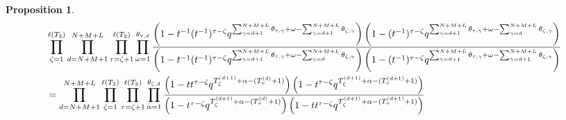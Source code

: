 \documentclass[12pt,reqno,a4paper]{amsart}
\numberwithin{equation}{section}
\newtheorem{prop}[thm]{Proposition}
\theoremstyle{definition}
\begin{document}
\begin{prop}
\label{prpa2-17aug-sun-1329}
\footnotesize
\begin{align}
	&\prod_{\zeta = 1}^{\ell(T_2)}
	\prod_{d = N+M+1}^{N+M+L} 
	\prod_{\tau = \zeta + 1}^{\ell(T_2)} 
	\prod_{\omega = 1}^{\theta_{\tau,d}}
	\frac{
		\left(		1 - t^{-1} (t^{-1})^{\tau - \zeta}	q^{	\sum_{\gamma = d+1}^{N + M + L}\theta_{\tau,\gamma}	+ \omega - 	\sum_{\gamma = d+ 1}^{N + M + L} \theta_{\zeta,\gamma}				}			\right)
		\left(
		1 - (t^{-1})^{\tau - \zeta}	q^{	\sum_{\gamma = d+1}^{N + M + L}\theta_{\tau,\gamma}	+ \omega - 	\sum_{\gamma = d}^{N + M + L} \theta_{\zeta,\gamma}				}		
		\right)
	}{
		\left(		1 - t^{-1} (t^{-1})^{\tau - \zeta}	q^{	\sum_{\gamma = d+1}^{N + M + L}\theta_{\tau,\gamma}	+ \omega - 	\sum_{\gamma = d}^{N + M + L} \theta_{\zeta,\gamma}				}			\right)
		\left(
		1 - (t^{-1})^{\tau - \zeta}	q^{	\sum_{\gamma = d+1}^{N + M + L}\theta_{\tau,\gamma}	+ \omega - 	\sum_{\gamma = d+1}^{N + M + L} \theta_{\zeta,\gamma}				}		
		\right)
	}
	\notag 
	\\
	&=
	\prod_{d = N+M+1}^{N+M+L} 
	\prod_{\zeta = 1}^{\ell(T_2)}
	\prod_{\tau = \zeta + 1}^{\ell(T_2)} 
	\prod_{\alpha = 1}^{\theta_{\zeta,d}}
	\frac{
		\left(		1 - t t^{\tau - \zeta} q^{ T^{(d+1)}_{\zeta} + \alpha	 -	(T^{(d)}_{\tau}	+ 1)		}					\right)
		\left(
		1 - t^{\tau - \zeta} q^{ T^{(d+1)}_{\zeta} + \alpha	-(	T^{(d+1)}_{\tau}	+ 1)		}	
		\right)
	}{
		\left(
		1 - t^{\tau - \zeta} q^{ T^{(d+1)}_{\zeta} + \alpha	 -	(T^{(d)}_{\tau} + 1)		}	
		\right)
		\left(		1 - t t^{\tau - \zeta} q^{	T^{(d+1)}_{\zeta} + \alpha	 - (T^{(d+1)}_{\tau}	+ 1)		}					\right)
	}
\end{align}
\normalsize
\end{prop}
\end{document}
